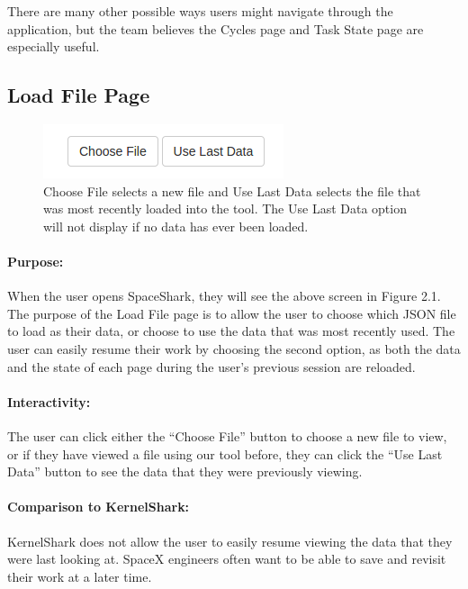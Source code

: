 \documentclass{hmcclinic}
\begin{document}
  There are many other possible ways users might navigate through the
  application, but the team believes the Cycles page and Task State page 
are especially useful.


\subsection{Load File Page}

\begin{figure}[H]
  \centering
      \includegraphics[scale=0.75]{loadFile-buttons.png}
  \caption{Choose File selects a new file and Use Last Data selects the file
  that was most recently loaded into the tool. The Use Last Data option will not
display if no data has ever been loaded.}
  \end{figure}

\paragraph{Purpose:}
When the user opens SpaceShark, they will see the above screen in Figure 2.1.
The purpose of the Load File page is to allow the user to choose which JSON file
to load as their data, or choose to use the data that was most recently used.
The user can easily resume their work by choosing the second option, as both the
data and the state of each page during the user's previous session are reloaded.

\paragraph{Interactivity:}
The user can click either the ``Choose File'' button to choose a new file to view, or if they have viewed a file using our tool before, they can click the ``Use Last Data'' button to see the data that they were previously viewing.

\paragraph{Comparison to KernelShark:}
KernelShark does not allow the user to easily resume viewing the data that they were last looking at. SpaceX engineers often want to be able to save and revisit their work at a later time. 
\end{document}
